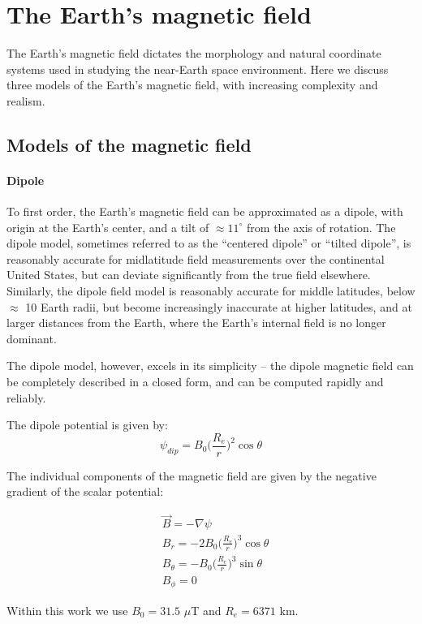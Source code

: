 \section{The Earth's magnetic field}
The Earth's magnetic field dictates the morphology and natural coordinate systems used in studying the near-Earth space environment. Here we discuss three models of the Earth's magnetic field, with increasing complexity and realism.
\subsection{Models of the magnetic field}
\paragraph{Dipole}
\label{section:dipole_model}
To first order, the Earth's magnetic field can be approximated as a dipole, with origin at the Earth's center, and a tilt of $\approx 11^\circ$ from the axis of rotation. The dipole model, sometimes referred to as the ``centered dipole'' or ``tilted dipole'', is reasonably accurate for midlatitude field measurements over the continental United States, but can deviate significantly from the true field elsewhere. Similarly, the dipole field model is reasonably accurate for middle latitudes, below $\approx$ 10 Earth radii, but become increasingly inaccurate at higher latitudes, and at larger distances from the Earth, where the Earth's internal field is no longer dominant.

The dipole model, however, excels in its simplicity -- the dipole magnetic field can be completely described in a closed form, and can be computed rapidly and reliably.

The dipole potential is given by:
\begin{equation}
\psi_{dip} = B_0\big(\frac{R_e}{r}\big)^2\cos\theta
\end{equation}

The individual components of the magnetic field are given by the negative gradient of the scalar potential:

\begin{eqnarray}
& \vec{B} = -\nabla \psi \\
& B_r = -2 B_0\big(\frac{R_e}{r}\big)^3\cos\theta \\
& B_{\theta} = -B_0\big(\frac{R_e}{r}\big)^3 \sin\theta \\ 
& B_\phi = 0
\end{eqnarray}

Within this work we use $B_0 = 31.5$ $\mu$T and $R_e=6371$ km.

